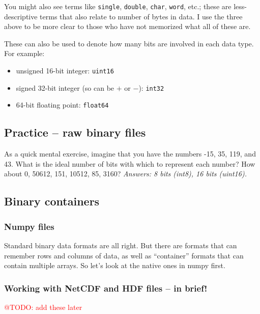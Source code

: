 \documentclass[a4paper,10pt]{scrartcl}
\makeatletter
\newcommand{\todo}[1]{\textcolor{red}{@TODO: #1}}
\makeatother
\begin{document}
You might also see terms like  \lstinline{single}, \lstinline{double}, \lstinline{char}, \lstinline{word}, etc.; these are less-descriptive terms that also relate to number of bytes in data. I use the three above to be more clear to those who have not memorized what all of these are.

These can also be used to denote how many bits are involved in each data type. For example:
\begin{itemize}
 \item unsigned 16-bit integer: \lstinline{uint16}
 \item signed 32-bit integer (so can be $+$ or $-$): \lstinline{int32}
 \item 64-bit floating point: \lstinline{float64}
\end{itemize}

\subsection{Practice -- raw binary files}



As a quick mental exercise, imagine that you have the numbers -15, 35, 119, and 43. What is the ideal number of bits with which to represent each number? How about 0, 50612, 151, 10512, 85, 3160? \textit{Answers: 8 bits (int8), 16 bits (uint16).}

\subsection{Binary containers}

\subsubsection{Numpy files}

Standard binary data formats are all right. But there are formats that can remember rows and columns of data, as well as ``container'' formats that can contain multiple arrays. So let's look at the native ones in numpy first.



\subsubsection{Working with NetCDF and HDF files -- in brief!}

\todo{add these later}
\end{document}
